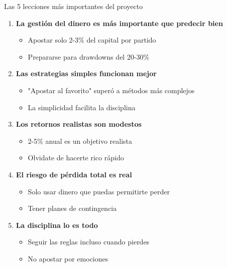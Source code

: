 \documentclass[aspectratio=169]{beamer}
\begin{document}
\begin{frame}{Las 5 lecciones más importantes del proyecto}
\begin{enumerate}
\item \textbf{\textcolor{verdeganancia}{La gestión del dinero es más importante que predecir bien}}
   \begin{itemize}
   \item Apostar solo 2-3\% del capital por partido
   \item Prepararse para drawdowns del 20-30\%
   \end{itemize}

\item \textbf{\textcolor{azulprincipal}{Las estrategias simples funcionan mejor}}
   \begin{itemize}
   \item "Apostar al favorito" superó a métodos más complejos
   \item La simplicidad facilita la disciplina
   \end{itemize}

\item \textbf{\textcolor{naranjaatencion}{Los retornos realistas son modestos}}
   \begin{itemize}
   \item 2-5\% anual es un objetivo realista
   \item Olvidate de hacerte rico rápido
   \end{itemize}

\item \textbf{\textcolor{rojoperdida}{El riesgo de pérdida total es real}}
   \begin{itemize}
   \item Solo usar dinero que puedas permitirte perder
   \item Tener planes de contingencia
   \end{itemize}

\item \textbf{\textcolor{azulprincipal}{La disciplina lo es todo}}
   \begin{itemize}
   \item Seguir las reglas incluso cuando pierdes
   \item No apostar por emociones
   \end{itemize}
\end{enumerate}
\end{frame}
\end{document}
